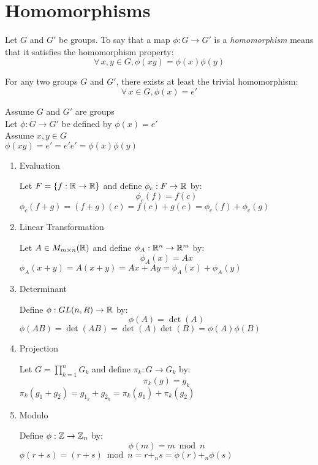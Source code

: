 \documentclass[letterpaper,12pt,fleqn]{article}
\newcommand{\p}{\phi}
\begin{document}
\section*{Homomorphisms}

\begin{definition}
  Let $G$ and $G'$ be groups. To say that a map $\p:G\to G'$ is a
  \emph{homomorphism} means that it satisfies the homomorphism property:
  \[\forall\,x,y\in G,\p(xy)=\p(x)\p(y)\]
\end{definition}

\begin{theorem}
  For any two groups $G$ and $G'$, there exists at least the trivial
  homomorphism:
  \[\forall\,x\in G,\p(x)=e'\]
\end{theorem}

\begin{theproof}
  Assume $G$ and $G'$ are groups \\
  Let $\p:G\to G'$ be defined by $\p(x)=e'$ \\
  Assume $x,y\in G$ \\
  $\p(xy)=e'=e'e'=\p(x)\p(y)$ \\
\end{theproof}

\begin{example}
  \listbreak
  \begin{enumerate}
  \item Evaluation
    
    Let $F=\{f:\mathbb{R}\to\mathbb{R}\}$ and define $\p_c:F\to\R$ by:
    \[\p_c(f)=f(c)\]
    $\p_c(f+g)=(f+g)(c)=f(c)+g(c)=\p_c(f)+\p_c(g)$

  \item Linear Transformation

    Let $A\in M_{m\times n}(\mathbb{R})$ and define $\p_A:\R^n\to\R^m$ by:
    \[\p_A(x)=Ax\]
    $\p_A(x+y)=A(x+y)=Ax+Ay=\p_A(x)+\p_A(y)$

  \item Determinant

    Define $\p:GL(n,R)\to\R$ by:
    \[\p(A)=\det(A)\]
    $\p(AB)=\det(AB)=\det(A)\det(B)=\p(A)\p(B)$

  \item Projection

    Let $G=\prod_{k=1}^nG_k$ and define $\pi_k:G\to G_k$ by:
    \[\pi_k(g)=g_k\]
    $\pi_k(g_1+g_2)=g_{1_k}+g_{2_k}=\pi_k(g_1)+\pi_k(g_2)$

  \item Modulo

    Define $\p:\Z\to\Z_n$ by:
    \[\p(m)=m\bmod n\]
    $\p(r+s)=(r+s)\bmod n=r+_n s=\p(r)+_n\p(s)$
  \end{enumerate}
\end{example}
\end{document}
